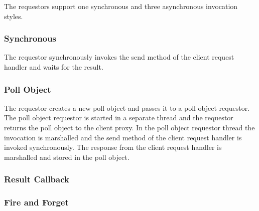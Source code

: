 The requestors support one synchronous and three asynchronous invocation styles.

\subsubsection{Synchronous}

The requestor synchronously invokes the send method of the client request handler and waits for the result.

\subsubsection{Poll Object}

The requestor creates a new poll object and passes it to a poll object requestor.
The poll object requestor is started in a separate thread and the requestor returns the poll object to the client proxy.
In the poll object requestor thread the invocation is marshalled and the send method of the client request handler is invoked synchronously.
The response from the client request handler is marshalled and stored in the poll object.

\subsubsection{Result Callback}



\subsubsection{Fire and Forget}
